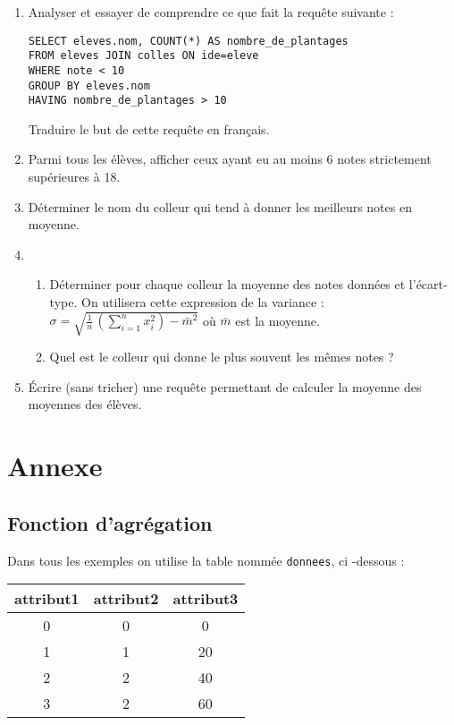 \begin{enumerate}
\item Analyser et essayer de comprendre ce que fait la requête suivante :

\verb|SELECT eleves.nom, COUNT(*) AS nombre_de_plantages|\\
\verb|FROM eleves JOIN colles ON ide=eleve|\\
\verb|WHERE note < 10|\\
\verb|GROUP BY eleves.nom|\\
\verb|HAVING nombre_de_plantages > 10|

Traduire le but de cette requête en français.

\item Parmi tous les élèves, afficher ceux ayant eu au moins 6 notes strictement supérieures à 18.

\item Déterminer le nom du colleur qui tend à donner les meilleurs notes en moyenne.

\item 
    \begin{enumerate}
    \item Déterminer pour chaque colleur la moyenne des notes données et l'écart-type. On utilisera cette expression de la variance : $\displaystyle \sigma =\sqrt{\frac{1}{n}\,\left(\sum_{i=1}^n x_i^2\right) - \bar{m}^2}$ où $\bar{m}$ est la moyenne.
    
    \item Quel est le colleur qui donne le plus souvent les mêmes notes ?
    \end{enumerate}

\item Écrire (sans tricher) une requête permettant de calculer la moyenne des moyennes des élèves.

\end{enumerate}

 \newpage
 \section{Annexe}
\subsection{Fonction d'agrégation}

Dans tous les exemples on utilise la table nommée \verb|donnees|, ci -dessous :
\begin{center}
\begin{tabular}{|c|c|c|}\hline
attribut1 & attribut2 & attribut3\\\hline
0 & 0 & 0\\\hline
1 & 1 & 20\\\hline
2 & 2 & 40\\\hline
3 & 2 & 60\\\hline
\end{tabular}
\end{center}

